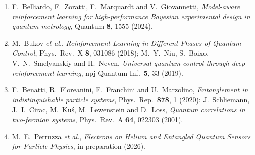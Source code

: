 \documentclass[12pt,a4paper]{article}
\begin{document}
\begin{enumerate}
    \item F.~Belliardo, F.~Zoratti, F.~Marquardt and V.~Giovannetti, \textit{Model-aware reinforcement learning for high-performance Bayesian experimental design in quantum metrology}, Quantum \textbf{8}, 1555 (2024).
    \item M.~Bukov \textit{et al.}, \textit{Reinforcement Learning in Different Phases of Quantum Control}, Phys.\ Rev.\ X \textbf{8}, 031086 (2018); M.~Y.~Niu, S.~Boixo, V.~N.~Smelyanskiy and H.~Neven, \textit{Universal quantum control through deep reinforcement learning}, npj Quantum Inf.\ \textbf{5}, 33 (2019).
    \item F.~Benatti, R.~Floreanini, F.~Franchini and U.~Marzolino, \textit{Entanglement in indistinguishable particle systems}, Phys.\ Rep.\ \textbf{878}, 1 (2020); J.~Schliemann, J.~I.~Cirac, M.~Ku\'s, M.~Lewenstein and D.~Loss, \textit{Quantum correlations in two-fermion systems}, Phys.\ Rev.\ A \textbf{64}, 022303 (2001).
    \item M.~E.~Perruzza \textit{et al.}, \textit{Electrons on Helium and Entangled Quantum Sensors for Particle Physics}, in preparation (2026).
\end{enumerate}
\end{document}
